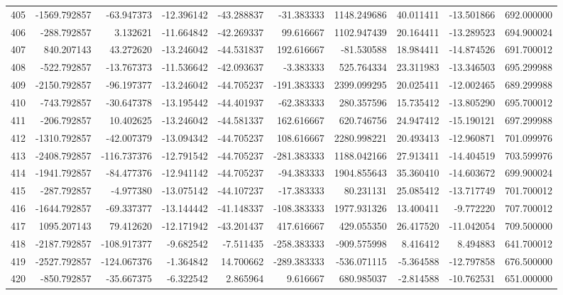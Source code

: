 \begin{tabular}{lrrrrrrrrr}
405 &  -1569.792857 &   -63.947373 & -12.396142 & -43.288837 &   -31.383333 &  1148.249686 &  40.011411 & -13.501866 &  692.000000 \\
406 &   -288.792857 &     3.132621 & -11.664842 & -42.269337 &    99.616667 &  1102.947439 &  20.164411 & -13.289523 &  694.900024 \\
407 &    840.207143 &    43.272620 & -13.246042 & -44.531837 &   192.616667 &   -81.530588 &  18.984411 & -14.874526 &  691.700012 \\
408 &   -522.792857 &   -13.767373 & -11.536642 & -42.093637 &    -3.383333 &   525.764334 &  23.311983 & -13.346503 &  695.299988 \\
409 &  -2150.792857 &   -96.197377 & -13.246042 & -44.705237 &  -191.383333 &  2399.099295 &  20.025411 & -12.002465 &  689.299988 \\
410 &   -743.792857 &   -30.647378 & -13.195442 & -44.401937 &   -62.383333 &   280.357596 &  15.735412 & -13.805290 &  695.700012 \\
411 &   -206.792857 &    10.402625 & -13.246042 & -44.581337 &   162.616667 &   620.746756 &  24.947412 & -15.190121 &  697.299988 \\
412 &  -1310.792857 &   -42.007379 & -13.094342 & -44.705237 &   108.616667 &  2280.998221 &  20.493413 & -12.960871 &  701.099976 \\
413 &  -2408.792857 &  -116.737376 & -12.791542 & -44.705237 &  -281.383333 &  1188.042166 &  27.913411 & -14.404519 &  703.599976 \\
414 &  -1941.792857 &   -84.477376 & -12.941142 & -44.705237 &   -94.383333 &  1904.855643 &  35.360410 & -14.603672 &  699.900024 \\
415 &   -287.792857 &    -4.977380 & -13.075142 & -44.107237 &   -17.383333 &    80.231131 &  25.085412 & -13.717749 &  701.700012 \\
416 &  -1644.792857 &   -69.337377 & -13.144442 & -41.148337 &  -108.383333 &  1977.931326 &  13.400411 &  -9.772220 &  707.700012 \\
417 &   1095.207143 &    79.412620 & -12.171942 & -43.201437 &   417.616667 &   429.055350 &  26.417520 & -11.042054 &  709.500000 \\
418 &  -2187.792857 &  -108.917377 &  -9.682542 &  -7.511435 &  -258.383333 &  -909.575998 &   8.416412 &   8.494883 &  641.700012 \\
419 &  -2527.792857 &  -124.067376 &  -1.364842 &  14.700662 &  -289.383333 &  -536.071115 &  -5.364588 & -12.797858 &  676.500000 \\
420 &   -850.792857 &   -35.667375 &  -6.322542 &   2.865964 &     9.616667 &   680.985037 &  -2.814588 & -10.762531 &  651.000000 \\
\bottomrule
\end{tabular}
